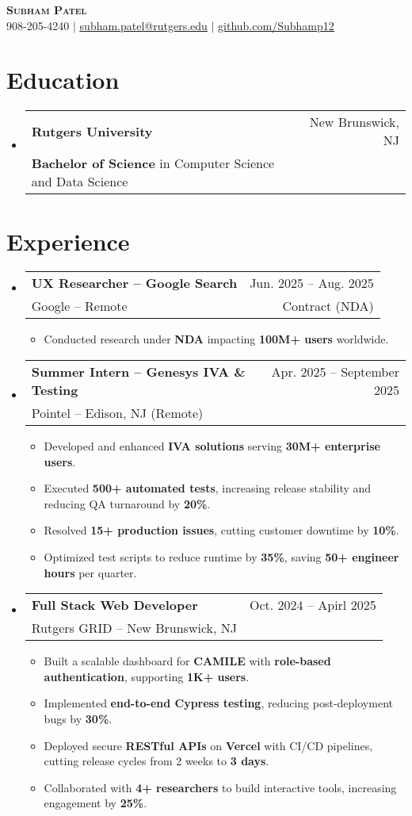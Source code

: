 \documentclass[letterpaper,11pt]{article}
\makeatletter
\newcommand{\resumeItem}[1]{
  \item\small{
    {#1 \vspace{-2pt}}
  }
}
\newcommand{\resumeSubheading}[4]{
  \vspace{-2pt}\item
    \begin{tabular*}{0.97\textwidth}[t]{l@{\extracolsep{\fill}}r}
      \textbf{#1} & #2 \\
      {\small#3} & {\small #4} \\
    \end{tabular*}\vspace{-7pt}
}
\newcommand{\resumeItemListStart}{\begin{itemize}}
\newcommand{\resumeItemListEnd}{\end{itemize}\vspace{-5pt}}
\makeatother
\begin{document}
\begin{center}
    \textbf{\Huge \scshape Subham Patel} \\ \vspace{1pt}
    \small 908-205-4240 $|$ \href{mailto:subham.patel@rutgers.edu}{\underline{subham.patel@rutgers.edu}} $|$ 
    \href{https://github.com/Subhamp12}{\underline{github.com/Subhamp12}}
\end{center}

\section{Education}
  \begin{itemize}[leftmargin=0.15in, label={}]
    \resumeSubheading
      {Rutgers University}{New Brunswick, NJ}
      {\textbf{Bachelor of Science} in Computer Science and Data Science}{}
  \end{itemize}

\section{Experience}
  \begin{itemize}[leftmargin=0.15in, label={}]
    \resumeSubheading
      {UX Researcher – Google Search}{Jun. 2025 -- Aug. 2025}
      {Google -- Remote}{Contract (NDA)}
      \resumeItemListStart
        \resumeItem{Conducted research under \textbf{NDA} impacting \textbf{100M+ users} worldwide.}
      \resumeItemListEnd

    \resumeSubheading
      {Summer Intern – Genesys IVA \& Testing}{Apr. 2025 -- September 2025}
      {Pointel -- Edison, NJ (Remote)}{}
      \resumeItemListStart
        \resumeItem{Developed and enhanced \textbf{IVA solutions} serving \textbf{30M+ enterprise users}.}
        \resumeItem{Executed \textbf{500+ automated tests}, increasing release stability and reducing QA turnaround by \textbf{20\%}.}
        \resumeItem{Resolved \textbf{15+ production issues}, cutting customer downtime by \textbf{10\%}.}
        \resumeItem{Optimized test scripts to reduce runtime by \textbf{35\%}, saving \textbf{50+ engineer hours} per quarter.}
      \resumeItemListEnd

    \resumeSubheading
      {Full Stack Web Developer}{Oct. 2024 -- Apirl 2025}
      {Rutgers GRID -- New Brunswick, NJ}{}
      \resumeItemListStart
        \resumeItem{Built a scalable dashboard for \textbf{CAMILE} with \textbf{role-based authentication}, supporting \textbf{1K+ users}.}
        \resumeItem{Implemented \textbf{end-to-end Cypress testing}, reducing post-deployment bugs by \textbf{30\%}.}
        \resumeItem{Deployed secure \textbf{RESTful APIs} on \textbf{Vercel} with CI/CD pipelines, cutting release cycles from 2 weeks to \textbf{3 days}.}
        \resumeItem{Collaborated with \textbf{4+ researchers} to build interactive tools, increasing engagement by \textbf{25\%}.}
      \resumeItemListEnd
  \end{itemize}
\end{document}

